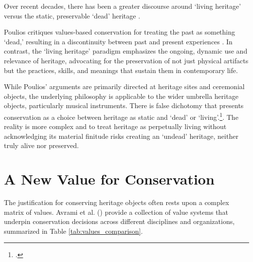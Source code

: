 Over recent decades, there has been a greater discourse around `living heritage' versus the static, preservable `dead' heritage \cite{poulios_moving_2010,smith_uses_2006}. 

Poulios critiques values-based conservation for treating the past as something `dead,' resulting in a discontinuity between past and present experiences \cite{poulios_moving_2010}. In contrast, the `living heritage' paradigm emphasizes the ongoing, dynamic use and relevance of heritage, advocating for the preservation of not just physical artifacts but the practices, skills, and meanings that sustain them in contemporary life.

While Poulios' arguments are primarily directed at heritage sites and ceremonial objects, the underlying philosophy is applicable to the wider umbrella heritage objects, particularly musical instruments. There is false dichotomy that presents conservation as a choice between heritage as static and `dead' or `living'.\footcite[``a handful dismissed the idea of heritage as a negative idea, noting for instance that heritage was ‘keeping that which aught to be alive dead.''][]{smith_uses_2006}.
The reality is more complex and to treat heritage as perpetually living without acknowledging its material finitude risks creating an `undead' heritage, neither truly alive nor preserved.

\section{A New Value for Conservation}

The justification for conserving heritage objects often rests upon a complex matrix of values. Avrami et al. (\citeyear{avrami_values_2000}) provide a collection of value systems that underpin conservation decisions across different disciplines and organizations, summarized in Table \ref{tab:values_comparison}.

